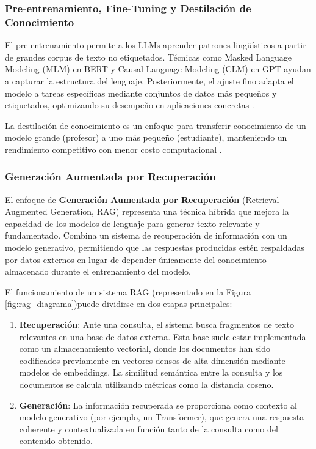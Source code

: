 \documentclass[../main.tex]{subfiles}
\begin{document}
\subsubsection{Pre-entrenamiento, Fine-Tuning y Destilación de Conocimiento}  
El pre-entrenamiento permite a los LLMs aprender patrones lingüísticos a partir de grandes corpus de texto no etiquetados. Técnicas como Masked Language Modeling (MLM) en BERT y Causal Language Modeling (CLM) en GPT ayudan a capturar la estructura del lenguaje. Posteriormente, el ajuste fino adapta el modelo a tareas específicas mediante conjuntos de datos más pequeños y etiquetados, optimizando su desempeño en aplicaciones concretas \parencite{ren2024learning}.

La destilación de conocimiento es un enfoque para transferir conocimiento de un modelo grande (profesor) a uno más pequeño (estudiante), manteniendo un rendimiento competitivo con menor costo computacional \parencite{sreenivasllm}.


\subsubsection{Generación Aumentada por Recuperación}

El enfoque de \textbf{Generación Aumentada por Recuperación} (Retrieval-Augmented Generation, RAG) representa una técnica híbrida que mejora la capacidad de los modelos de lenguaje para generar texto relevante y fundamentado. Combina un sistema de recuperación de información con un modelo generativo, permitiendo que las respuestas producidas estén respaldadas por datos externos en lugar de depender únicamente del conocimiento almacenado durante el entrenamiento del modelo.

El funcionamiento de un sistema RAG (representado en la Figura \ref{fig:rag_diagrama})puede dividirse en dos etapas principales:

\begin{enumerate}
	\item \textbf{Recuperación}: Ante una consulta, el sistema busca fragmentos de texto relevantes en una base de datos externa. Esta base suele estar implementada como un almacenamiento vectorial, donde los documentos han sido codificados previamente en vectores densos de alta dimensión mediante modelos de embeddings. La similitud semántica entre la consulta y los documentos se calcula utilizando métricas como la distancia coseno.
	
	\item \textbf{Generación}: La información recuperada se proporciona como contexto al modelo generativo (por ejemplo, un Transformer), que genera una respuesta coherente y contextualizada en función tanto de la consulta como del contenido obtenido.
\end{enumerate}
\end{document}
